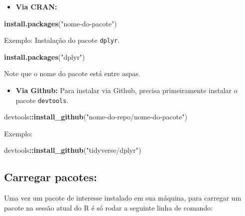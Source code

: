 \documentclass[
]{book}
\newenvironment{Shaded}{\begin{snugshade}}{\end{snugshade}}
\newcommand{\KeywordTok}[1]{\textcolor[rgb]{0.13,0.29,0.53}{\textbf{#1}}}
\newcommand{\NormalTok}[1]{#1}
\newcommand{\OperatorTok}[1]{\textcolor[rgb]{0.81,0.36,0.00}{\textbf{#1}}}
\newcommand{\StringTok}[1]{\textcolor[rgb]{0.31,0.60,0.02}{#1}}
\providecommand{\tightlist}{%
  \setlength{\itemsep}{0pt}\setlength{\parskip}{0pt}}
\begin{document}
\begin{itemize}
\tightlist
\item
  \textbf{Via CRAN:}
\end{itemize}

\begin{Shaded}
\begin{Highlighting}[]
\KeywordTok{install.packages}\NormalTok{(}\StringTok{"nome-do-pacote"}\NormalTok{)}
\end{Highlighting}
\end{Shaded}

Exemplo: Instalação do pacote \texttt{dplyr}.

\begin{Shaded}
\begin{Highlighting}[]
\KeywordTok{install.packages}\NormalTok{(}\StringTok{"dplyr"}\NormalTok{)}
\end{Highlighting}
\end{Shaded}

Note que o nome do pacote está entre aspas.

\begin{itemize}
\tightlist
\item
  \textbf{Via Github:}
  Para instalar via Github, precisa primeiramente instalar o pacote \texttt{devtools}.
\end{itemize}

\begin{Shaded}
\begin{Highlighting}[]
\NormalTok{devtools}\OperatorTok{::}\KeywordTok{install_github}\NormalTok{(}\StringTok{"nome-do-repo/nome-do-pacote"}\NormalTok{)}
\end{Highlighting}
\end{Shaded}

Exemplo:

\begin{Shaded}
\begin{Highlighting}[]
\NormalTok{devtools}\OperatorTok{::}\KeywordTok{install_github}\NormalTok{(}\StringTok{"tidyverse/dplyr"}\NormalTok{)}
\end{Highlighting}
\end{Shaded}

\hypertarget{carregar-pacotes}{%
\subsection{Carregar pacotes:}\label{carregar-pacotes}}

Uma vez um pacote de interesse instalado em sua máquina, para carregar um pacote na sessão atual do R é só rodar a seguinte linha de comando:
\end{document}
